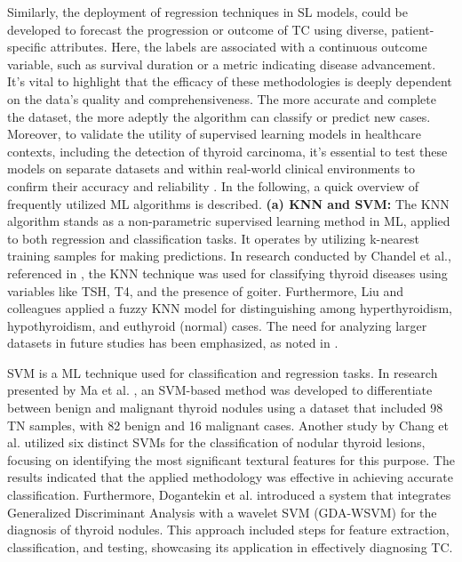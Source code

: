 \documentclass[a4paper,fleqn]{cas-sc}
\begin{document}
Similarly, the deployment of regression techniques in \ac{SL} models, could be developed to forecast the progression or outcome of TC using diverse, patient-specific attributes. Here, the labels are associated with a continuous outcome variable, such as survival duration or a metric indicating disease advancement. It's vital to highlight that the efficacy of these methodologies is deeply dependent on the data's quality and comprehensiveness. The more accurate and complete the dataset, the more adeptly the algorithm can classify or predict new cases. Moreover, to validate the utility of supervised learning models in healthcare contexts, including the detection of thyroid carcinoma, it's essential to test these models on separate datasets and within real-world clinical environments to confirm their accuracy and reliability \cite{liu2023self, hou2023boosting}. In the following, a quick overview of frequently utilized \ac{ML} algorithms is described.
\vskip2mm
\noindent \textbf{(a)  KNN and SVM: } The \ac{KNN} algorithm stands as a non-parametric supervised learning method in \ac{ML}, applied to both regression and classification tasks. It operates by utilizing k-nearest training samples for making predictions. In research conducted by Chandel et al., referenced in \cite{chandel2016comparative}, the \ac{KNN} technique was used for classifying thyroid diseases using variables like TSH, T4, and the presence of goiter. Furthermore, Liu and colleagues \cite{liu2012design} applied a fuzzy \ac{KNN} model for distinguishing among hyperthyroidism, hypothyroidism, and euthyroid (normal) cases. The need for analyzing larger datasets in future studies has been emphasized, as noted in \cite{geetha2016empirical}.
\vskip2mm

\ac{SVM} is a \ac{ML} technique used for classification and regression tasks. In research presented by Ma et al. \cite{ma2010differential}, an \ac{SVM}-based method was developed to differentiate between benign and malignant thyroid nodules using a dataset that included 98 \ac{TN} samples, with 82 benign and 16 malignant cases. Another study by Chang et al. \cite{chang2010application} utilized six distinct \acp{SVM} for the classification of nodular thyroid lesions, focusing on identifying the most significant textural features for this purpose. The results indicated that the applied methodology was effective in achieving accurate classification. Furthermore, Dogantekin et al. \cite{dogantekin2011expert} introduced a system that integrates Generalized Discriminant Analysis with a wavelet \ac{SVM} (GDA-WSVM) for the diagnosis of thyroid nodules. This approach included steps for feature extraction, classification, and testing, showcasing its application in effectively diagnosing TC.
\end{document}
